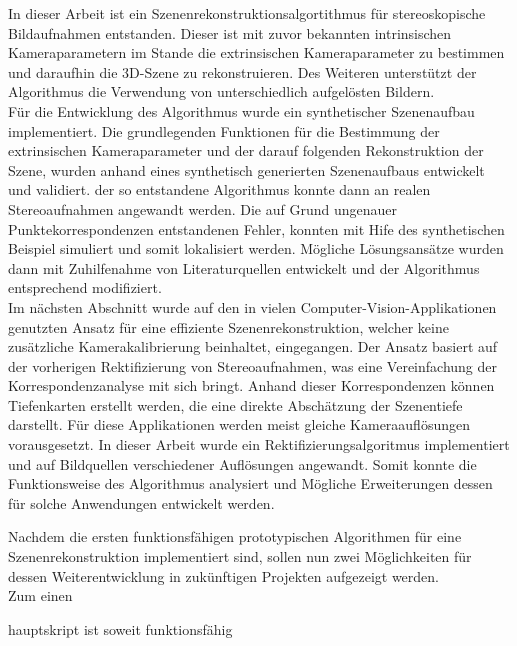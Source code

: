 

In dieser Arbeit ist ein Szenenrekonstruktionsalgortithmus für stereoskopische Bildaufnahmen entstanden. Dieser ist mit zuvor bekannten intrinsischen Kameraparametern im Stande die extrinsischen Kameraparameter zu bestimmen und daraufhin die 3D-Szene zu rekonstruieren. Des Weiteren unterstützt der Algorithmus die Verwendung von unterschiedlich aufgelösten Bildern. \\

Für die Entwicklung des Algorithmus wurde ein synthetischer Szenenaufbau implementiert. Die grundlegenden Funktionen für die Bestimmung der extrinsischen Kameraparameter und der darauf folgenden Rekonstruktion der Szene, wurden anhand eines synthetisch generierten Szenenaufbaus entwickelt und validiert. der so entstandene Algorithmus konnte dann an realen Stereoaufnahmen angewandt werden. Die auf Grund ungenauer Punktekorrespondenzen entstandenen Fehler, konnten mit Hife des synthetischen Beispiel simuliert und somit lokalisiert werden. Mögliche Lösungsansätze wurden dann mit Zuhilfenahme von Literaturquellen entwickelt und der Algorithmus entsprechend modifiziert. \\

Im nächsten Abschnitt wurde auf den in vielen Computer-Vision-Applikationen genutzten Ansatz für eine effiziente Szenenrekonstruktion, welcher keine zusätzliche Kamerakalibrierung beinhaltet, eingegangen. Der Ansatz basiert auf der vorherigen Rektifizierung von Stereoaufnahmen, was eine Vereinfachung der Korrespondenzanalyse mit sich bringt. Anhand dieser Korrespondenzen können Tiefenkarten erstellt werden, die eine direkte Abschätzung der Szenentiefe darstellt. Für diese Applikationen werden meist gleiche Kameraauflösungen vorausgesetzt. In dieser Arbeit wurde ein Rektifizierungsalgoritmus implementiert und auf Bildquellen verschiedener Auflösungen angewandt. Somit konnte die Funktionsweise des Algorithmus analysiert und Mögliche Erweiterungen dessen für solche Anwendungen entwickelt werden. 


Nachdem die ersten funktionsfähigen prototypischen Algorithmen für eine Szenenrekonstruktion implementiert sind, sollen nun zwei Möglichkeiten für dessen Weiterentwicklung in zukünftigen Projekten aufgezeigt werden.\\

Zum einen  



hauptskript ist soweit funktionsfähig 

